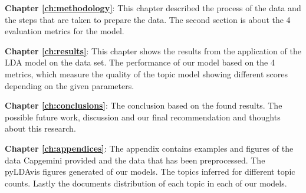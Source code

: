 \textbf{Chapter \ref{ch:methodology}}: This chapter described the process of the data and the steps that are taken to prepare the data. The second section is about the 4 evaluation metrics for the model.

\textbf{Chapter \ref{ch:results}}: This chapter shows the results from the application of the LDA model on the data set. The performance of our model based on the 4 metrics, which measure the quality of the topic model showing different scores depending on the given parameters.

\textbf{Chapter \ref{ch:conclusions}}: The conclusion based on the found results. The possible future work, discussion and our final recommendation and thoughts about this research.

\textbf{Chapter \ref{ch:appendices}}: The appendix contains examples and figures of the data Capgemini provided and the data that has been preprocessed. The pyLDAvis figures generated of our models. The topics inferred for different topic counts. Lastly the documents distribution of each topic in each of our models.

\begin{comment}
It is recommended to end the introduction with an overview of the thesis. This chapter contains the introduction; Chapter~\ref{ch:definitions} includes the definitions; Chapter~\ref{ch:relatedwork} discusses related work; Chapter~\ref{ch:evaluation} evaluates the contributions; Chapter~\ref{ch:conclusions} concludes.

Also make a nice sentence with ``bachelor thesis'', LIACS and the names of the supervisors.

\end{comment}